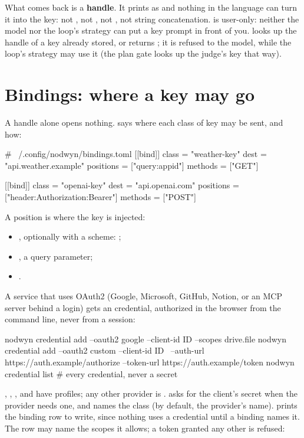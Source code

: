 What comes back is a \textbf{handle}. It prints as
 and nothing in the language can turn it into the
key: not , not , not , not
string concatenation.  is user-only: neither the
model nor the loop's strategy can put a key prompt in front of you.
 looks up the handle of a key already
stored, or returns ; it is refused to the model, while the loop's
strategy may use it (the plan gate looks up the judge's key that way).

\section{Bindings: where a key may go}

A handle alone opens nothing.  says where each class of
key may be sent, and how:

\begin{toml}
# ~/.config/nodwyn/bindings.toml
[[bind]]
class = "weather-key"
dest = "api.weather.example"
positions = ["query:appid"]
methods = ["GET"]

[[bind]]
class = "openai-key"
dest = "api.openai.com"
positions = ["header:Authorization:Bearer"]
methods = ["POST"]
\end{toml}

A position is where the key is injected:

\begin{itemize}
  \item {}, optionally with a scheme:
    ;
  \item {}, a query parameter;
  \item {}.
\end{itemize}

A service that uses OAuth2 (Google, Microsoft, GitHub, Notion, or an MCP
server behind a login) gets an  credential, authorized in the
browser from the command line, never from a session:

\begin{sh}
nodwyn credential add --oauth2 google --client-id ID --scopes drive.file
nodwyn credential add --oauth2 custom --client-id ID \
    --auth-url https://auth.example/authorize --token-url https://auth.example/token
nodwyn credential list        # every credential, never a secret
\end{sh}

, , ,  and  have
profiles; any other provider is \code{custom}. \code{-{}-client-secret}
asks for the client's secret when the provider needs one, and
 names the class (by default, the provider's name).
\code{add} prints the binding row to write, since nothing uses a credential
until a binding names it. The row may name the scopes it allows; a token
granted any other is refused:

